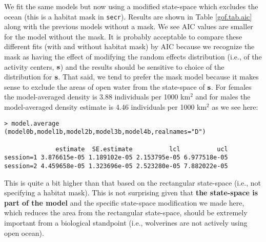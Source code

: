{We fit the same models but now using a modified state-space which
excludes the ocean (this is a habitat mask in \mbox{\tt secr}).
 Results are shown in Table \ref{gof.tab.aic} along with
the previous models without a mask.  We see AIC values are smaller for
the model without the mask. It is probably acceptable to compare these
different fits (with and without habitat mask) by AIC because we
recognize the mask as having the effect of modifying the random
effects distribution (i.e., of the activity centers, ${\bf s}$) and
the results should be sensitive to choice of the distribution for
${\bf s}$. That said, we tend to prefer the mask model because it
makes sense to exclude the areas of open water from the state-space of ${\bf
  s}$.  For females the model-averaged density is 3.88 individuals per
1000 km$^2$ and for males the model-averaged density estimate is 4.46
individuals per 1000 km$^2$ as we see here:
{\small
\begin{verbatim}
> model.average (model0b,model1b,model2b,model3b,model4b,realnames="D")

              estimate  SE.estimate          lcl          ucl
session=1 3.876615e-05 1.189102e-05 2.153795e-05 6.977518e-05
session=2 4.459658e-05 1.323696e-05 2.523280e-05 7.882022e-05
\end{verbatim}
}
This is quite a bit higher than that based on the rectangular state-space
(i.e., not specifying a habitat mask). This is not surprising given
that {\bf the state-space is part of the model} and the specific
state-space modification we made here, which reduces the area from the
rectangular state-space, should be extremely important
from a biological standpoint (i.e., wolverines are not actively using 
open ocean). 

\begin{comment}
\begin{verbatim}
             without mask
                              female?            male?
    model                   D    p0  sigma    D   p0   sigma
D(sex),g0(sex),\sigma      2.45 0.08 6435.51 3.16 0.04 6435.51
D,g0,\sigma                2.83 0.06 6298.66 2.83 0.06 6298.66
D(sex),g0,\sigma           2.69 0.06 6298.69 2.96 0.06 6298.69
D(sex),g0(sex),\sigma(sex) 2.59 0.08 6080.70 2.99 0.04 6833.16
D(sex),g0, \sigma(sex)     2.70 0.06 6280.49 2.95 0.06 6319.03


             with mask
                              female?            male?
    model                   D    p0  sigma    D   p0   sigma
D(sex),g0(sex),\sigma      3.64 0.07 6382.88 4.73 0.03 6382.88
D(sex),g0(sex)\sigma(sex)  3.87 0.07 5859.40 4.41 0.03 7039.09
D, g0, \sigma              4.18 0.05 6282.62 4.18 0.05 6282.62
D(sex),g0,\sigma           3.98 0.05 6282.65 4.38 0.05 6282.65
D(sex),g0,\sigma(sex)      3.93 0.05 6357.26 4.41 0.05 6220.22
\end{verbatim}
\end{comment}




}
